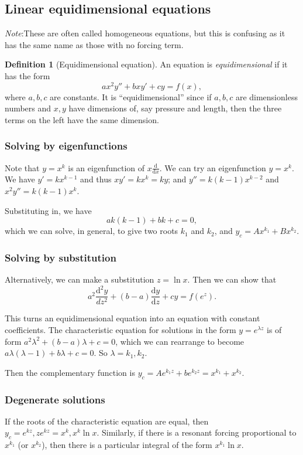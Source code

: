 \documentclass[a4paper]{article}
\theoremstyle{definition}
\newtheorem*{defi}{Definition}
\newcommand{\note}{\noindent \emph{Note}:\;}
\renewcommand{\d}{\mathrm{d}}
\begin{document}
\subsection{Linear equidimensional equations}
\note These are often called homogeneous equations, but this is confusing as it has the same name as those with no forcing term.

\begin{defi}[Equidimensional equation]
  An equation is \emph{equidimensional} if it has the form
  \[
  ax^2y'' + bxy' + cy = f(x),
  \]
  where $a, b, c$ are constants. It is ``equidimensional'' since if $a, b, c$ are dimensionless numbers and $x, y$ have dimensions of, say pressure and length, then the three terms on the left have the same dimension.
\end{defi}

\subsubsection{Solving by eigenfunctions}
Note that $y = x^k$ is an eigenfunction of $x\frac{\d}{\d x}$. We can try an eigenfunction $y = x^k$. We have $y' = kx^{k - 1}$ and thus $xy' = kx^k = ky$; and $y'' = k(k - 1)x^{k - 2}$ and $x^2y'' = k(k - 1)x^k$.

Substituting in, we have
\[
ak(k - 1) + bk + c = 0,
\]
which we can solve, in general, to give two roots $k_1$ and $k_2$, and $y_c = Ax^{k_1} + Bx^{k_2}$.

\subsubsection{Solving by substitution}
Alternatively, we can make a substitution $z = \ln x$. Then we can show that 
\[
a^2\frac{\d ^2 y}{d z^2} + (b - a)\frac{\d y}{\d z} + cy = f(e^z).
\]

This turns an equidimensional equation into an equation with constant coefficients. The characteristic equation for solutions in the form $y = e^{\lambda z}$ is of form $a^2\lambda^2 + (b - a)\lambda + c = 0$, which we can rearrange to become $a\lambda(\lambda - 1) + b\lambda + c = 0$. So $\lambda = k_1, k_2$.

Then the complementary function is $y_c = Ae^{k_1z} + be^{k_2z} = x^{k_1} + x^{k_2}$.

\subsubsection{Degenerate solutions}
If the roots of the characteristic equation are equal, then $y_c = e^{kz}, ze^{kz} = x^k, x^k\ln x$. Similarly, if there is a resonant forcing proportional to $x^{k_1}$ (or $x^{k_2}$), then there is a particular integral of the form $x^{k_1}\ln x$.
\end{document}
